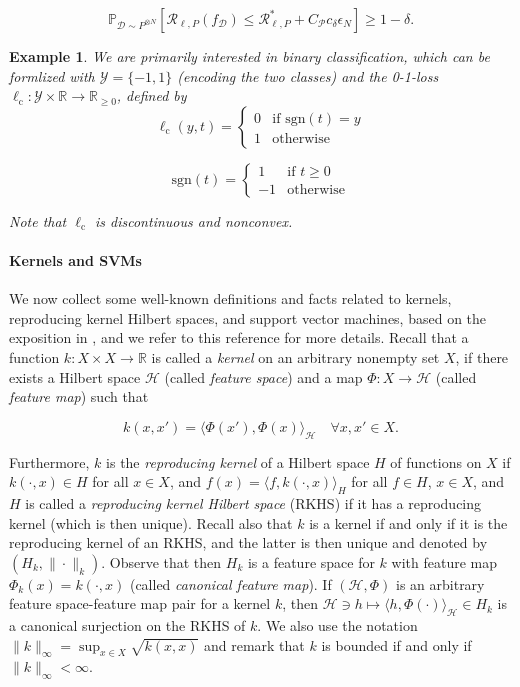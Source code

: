 \documentclass[letterpaper]{article} %
\newcommand{\R}{\mathbb{R}}
\newcommand{\Rnn}{\R_{\geq 0}}
\newcommand{\Pb}{\mathbb{P}}
\newcommand{\distr}{\sim}
\newcommand{\fm}{\Phi} %
\newcommand{\fs}{\mathcal{H}} %
\newcommand{\outputSet}{\mathcal{Y}} %
\newcommand{\dataSet}{\mathcal{D}}
\newcommand{\risk}{\mathcal{R}} %
\newcommand{\Risk}[2]{\risk_{{#1},{#2}}} %
\newcommand{\RiskBayes}[2]{\risk_{{#1},{#2}}^\ast} %
\newcommand{\defm}[1]{\emph{#1}}
\newcommand{\ellClass}{\ell_{\mathrm{c}}} %
\newcommand{\sgn}{\mathrm{sgn}}
\newtheorem{example}[theorem]{Example}
\newif\ifNotMuchSpace
\begin{document}
\begin{equation}
    \Pb_{\dataSet\distr P^{\otimes N}}[\Risk{\ell}{P}(f_\dataSet) \leq \RiskBayes{\ell}{P} + C_\mathcal{P}c_\delta\epsilon_N] \geq 1-\delta.
\end{equation}
\begin{example} \label{example:distrslt:classificationLoss}
We are primarily interested in binary classification, which can be formlized with $\outputSet=\{-1,1\}$ (encoding the two classes)
and the 0-1-loss $\ellClass:\outputSet\times\R\rightarrow\Rnn$, defined by
\begin{equation*}
    \ellClass(y,t) = \begin{cases}
        0 & \text{if } \sgn(t) = y \\
        1 & \text{otherwise}
    \end{cases}
\end{equation*}
\ifNotMuchSpace
where $\sgn(t)=1$ if $t\geq 0$, and $-1$ otherwise.
\else
\begin{equation*}
    \sgn(t) = \begin{cases}
        1 & \text{if } t \geq 0 \\
        -1 & \text{otherwise}
    \end{cases}
\end{equation*}
\fi
Note that $\ellClass$ is discontinuous and nonconvex.
\end{example}
\paragraph{Kernels and SVMs}
We now collect some well-known definitions and facts related to kernels, reproducing kernel Hilbert spaces, and support vector machines, based on the exposition in \cite{SC08}, and we refer to this reference for more details.
Recall that a function $k:X\times X\rightarrow\R$ is called a \defm{kernel} on an arbitrary nonempty set $X$, if there exists a Hilbert space $\fs$ (called \defm{feature space}) and a map $\fm: X \rightarrow\fs$ (called \defm{feature map})
such that
\ifNotMuchSpace
$k(x,x')=\langle \fm(x'), \fm(x) \rangle_\fs$ for all $x,x'\in X$.
\else
\begin{equation*}
    k(x,x')=\langle \fm(x'), \fm(x) \rangle_\fs \quad \forall x,x'\in X.
\end{equation*}
\fi
Furthermore, $k$ is the \defm{reproducing kernel} of a Hilbert space $H$ of functions on $X$ if $k(\cdot,x)\in H$ for all $x\in X$, and $f(x)=\langle f, k(\cdot,x)\rangle_H$ for all $f\in H$, $x\in X$, and $H$ is called a \defm{reproducing kernel Hilbert space} (RKHS) if it has a reproducing kernel (which is then unique).
Recall also that $k$ is a kernel if and only if it is the reproducing kernel of an RKHS, and the latter is then unique and denoted by $(H_k,\|\cdot\|_k)$.
Observe that then $H_k$ is a feature space for $k$ with feature map $\fm_k(x)=k(\cdot,x)$ (called \defm{canonical feature map}).
If $(\fs,\fm)$ is an arbitrary feature space-feature map pair for a kernel $k$, then $\fs \ni h \mapsto \langle h, \fm(\cdot) \rangle_\fs \in H_k$ is a canonical surjection on the RKHS of $k$.
We also use the notation $\|k\|_\infty=\sup_{x\in X} \sqrt{k(x,x)}$ and remark that $k$ is bounded if and only if $\|k\|_\infty<\infty$.
\end{document}
